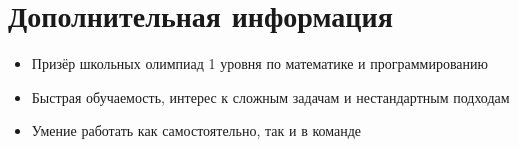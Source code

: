 \documentclass[a4paper,12pt]{article}
\begin{document}
\section*{Дополнительная информация}
\begin{itemize}[leftmargin=1.5em]
    \item Призёр школьных олимпиад 1 уровня по математике и программированию 
    \item Быстрая обучаемость, интерес к сложным задачам и нестандартным подходам
    \item Умение работать как самостоятельно, так и в команде
\end{itemize}
\end{document}
